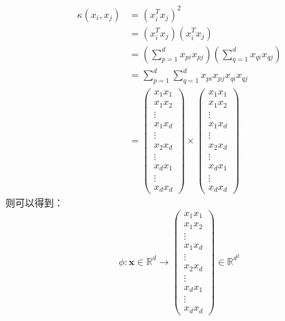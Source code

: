 \documentclass[UTF8,a4paper,AutoFakeBold,AutoFakeSlant]{article}
\begin{document}
\begin{equation*}
  \begin{aligned}
    \kappa\left(x_{i}, x_{j}\right) & =\left(x_{i}^{T} x_{j}\right)^{2}                                                        \\
                                    & =\left(x_{i}^{T} x_{j}\right)\left(x_{i}^{T} x_{j}\right)                                \\
                                    & =\left(\sum_{p=1}^{d} x_{p i} x_{p j}\right)\left(\sum_{q=1}^{d} x_{q i} x_{q j}\right)  \\
                                    & =\sum_{p=1}^{d} \sum_{q=1}^{d} x_{p i} x_{p j} x_{q i} x_{q j}                           \\
                                    & =\left(\begin{array}{c}
        x_{1} x_{1} \\
        x_{1} x_{2} \\
        \vdots      \\
        x_{1} x_{d} \\
        \vdots      \\
        x_{2} x_{d} \\
        \vdots      \\
        x_{d} x_{1} \\
        \vdots      \\
        x_{d} x_{d}
      \end{array}\right) \times\left(\begin{array}{c}
        x_{1} x_{1} \\
        x_{1} x_{2} \\
        \vdots      \\
        x_{1} x_{d} \\
        \vdots      \\
        x_{2} x_{d} \\
        \vdots      \\
        x_{d} x_{1} \\
        \vdots      \\
        x_{d} x_{d}
      \end{array}\right)
  \end{aligned}
\end{equation*}
则可以得到：
\begin{equation*}
  \phi: \boldsymbol{x} \in \mathbb{R}^{d} \rightarrow\left(\begin{array}{c}
      x_{1} x_{1} \\
      x_{1} x_{2} \\
      \vdots      \\
      x_{1} x_{d} \\
      \vdots      \\
      x_{2} x_{d} \\
      \vdots      \\
      x_{d} x_{1} \\
      \vdots      \\
      x_{d} x_{d}
    \end{array}\right) \in \mathbb{R}^{d^{2}}
\end{equation*}
\end{document}
